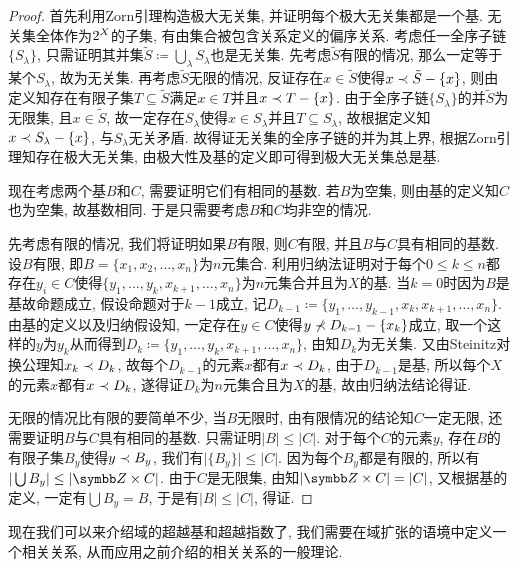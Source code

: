 \begin{proof}
  首先利用Zorn引理构造极大无关集, 并证明每个极大无关集都是一个基. 无关集全体作为$2^{X}$的子集, 有由集合被包含关系定义的偏序关系. 考虑任一全序子链$\{S_\lambda\}$, 只需证明其并集$\tilde{S}\coloneq \bigcup_\lambda S_\lambda$也是无关集. 先考虑$\tilde{S}$有限的情况, 那么一定等于某个$S_\lambda$, 故为无关集. 再考虑$\tilde{S}$无限的情况, 反证存在$x\in \tilde{S}$使得$x\prec \tilde{S}-\{x\}$, 则由定义知存在有限子集$T\subseteq\tilde{S}$满足$x\in T$并且$x\prec T-\{x\}$. 由于全序子链$\{S_\lambda\}$的并$\tilde{S}$为无限集, 且$x\in \tilde{S}$, 故一定存在$S_\lambda$使得$x\in S_\lambda$并且$T\subseteq S_\lambda$, 故根据定义知$x\prec S_\lambda-\{x\}$, 与$S_\lambda$无关矛盾. 故得证无关集的全序子链的并为其上界, 根据Zorn引理知存在极大无关集, 由极大性及基的定义即可得到极大无关集总是基.

  现在考虑两个基$B$和$C$, 需要证明它们有相同的基数. 若$B$为空集, 则由基的定义知$C$也为空集, 故基数相同. 于是只需要考虑$B$和$C$均非空的情况.

  先考虑有限的情况, 我们将证明如果$B$有限, 则$C$有限, 并且$B$与$C$具有相同的基数. 设$B$有限, 即$B=\{x_1, x_2, \dotsc, x_n\}$为$n$元集合. 利用归纳法证明对于每个$0\leq k\leq n$都存在$y_i\in C$使得$\{y_1, \dotsc, y_k, x_{k+1}, \dotsc, x_n\}$为$n$元集合并且为$X$的基. 当$k=0$时因为$B$是基故命题成立, 假设命题对于$k-1$成立, 记$D_{k-1}\coloneq \{y_1, \dotsc, y_{k-1}, x_k, x_{k+1}, \dotsc, x_n\}$. 由基的定义以及归纳假设知, 一定存在$y\in C$使得$y\nprec D_{k-1}-\{x_k\}$成立, 取一个这样的$y$为$y_k$从而得到$D_k\coloneq \{y_1, \dotsc, y_k, x_{k+1}, \dotsc, x_n\}$, 由知$D_k$为无关集. 又由Steinitz对换公理知$x_k\prec D_k$, 故每个$D_{k-1}$的元素$x$都有$x\prec D_k$, 由于$D_{k-1}$是基, 所以每个$X$的元素$x$都有$x\prec D_{k}$, 遂得证$D_k$为$n$元集合且为$X$的基, 故由归纳法结论得证.

  无限的情况比有限的要简单不少, 当$B$无限时, 由有限情况的结论知$C$一定无限, 还需要证明$B$与$C$具有相同的基数. 只需证明$\vert B\vert\leq \vert C\vert$. 对于每个$C$的元素$y$, 存在$B$的有限子集$B_y$使得$y\prec B_y$, 我们有$\vert \{B_y\}\vert\leq \vert C\vert$. 因为每个$B_y$都是有限的, 所以有$\vert\bigcup B_y\vert\leq \vert\ZZ\times C\vert$. 由于$C$是无限集, 由知$\vert\ZZ\times C\vert=\vert C\vert$, 又根据基的定义, 一定有$\bigcup B_y=B$, 于是有$\vert B\vert\leq\vert C\vert$, 得证.
\end{proof}

现在我们可以来介绍域的超越基和超越指数了, 我们需要在域扩张的语境中定义一个相关关系, 从而应用之前介绍的相关关系的一般理论.

